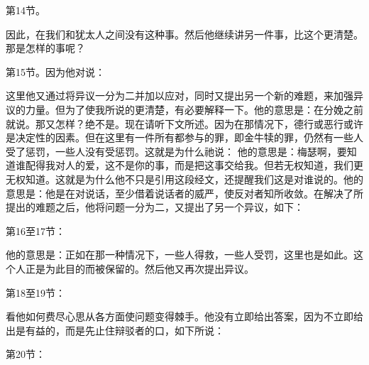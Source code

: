 
第14节。\par

因此，在我们和犹太人之间没有这种事。然后他继续讲另一件事，比这个更清楚。那是怎样的事呢？\par

第15节。因为他对说：\par

这里他又通过将异议一分为二并加以应对，同时又提出另一个新的难题，来加强异议的力量。但为了使我所说的更清楚，有必要解释一下。他的意思是：在分娩之前就说。那又怎样？绝不是。现在请听下文所述。因为在那情况下，德行或恶行或许是决定性的因素。但在这里有一件所有都参与的罪，即金牛犊的罪，仍然有一些人受了惩罚，一些人没有受惩罚。这就是为什么祂说： 他的意思是：梅瑟啊，要知道谁配得我对人的爱，这不是你的事，而是把这事交给我。但若无权知道，我们更无权知道。这就是为什么他不只是引用这段经文，还提醒我们这是对谁说的。他的意思是：他是在对说话，至少借着说话者的威严，使反对者知所收敛。在解决了所提出的难题之后，他将问题一分为二，又提出了另一个异议，如下：\par

第16至17节：\par

他的意思是：正如在那一种情况下，一些人得救，一些人受罚，这里也是如此。这个人正是为此目的而被保留的。然后他又再次提出异议。\par

第18至19节：\par

看他如何费尽心思从各方面使问题变得棘手。他没有立即给出答案，因为不立即给出是有益的，而是先止住辩驳者的口，如下所说：\par

第20节：\par

